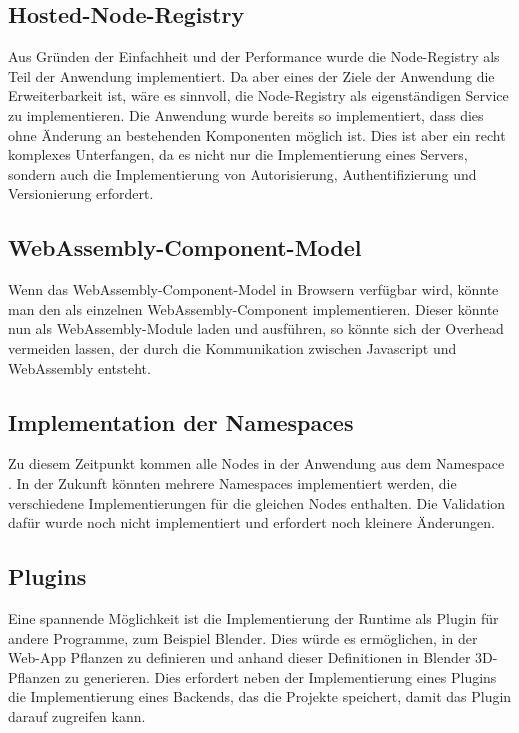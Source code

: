 \documentclass[ngerman]{article}
\begin{document}
\subsection*{Hosted-Node-Registry}
Aus Gründen der Einfachheit und der Performance wurde die Node-Registry als Teil der Anwendung implementiert. Da aber eines der Ziele der Anwendung die Erweiterbarkeit ist, wäre es sinnvoll, die Node-Registry als eigenständigen Service zu implementieren. Die Anwendung wurde bereits so implementiert, dass dies ohne Änderung an bestehenden Komponenten möglich ist.
\br
Dies ist aber ein recht komplexes Unterfangen, da es nicht nur die Implementierung eines Servers, sondern auch die Implementierung von Autorisierung, Authentifizierung und Versionierung erfordert.

\subsection*{WebAssembly-Component-Model}
Wenn das WebAssembly-Component-Model in Browsern verfügbar wird, könnte man den  als einzelnen WebAssembly-Component implementieren. Dieser könnte nun  als WebAssembly-Module laden und ausführen, so könnte sich der Overhead vermeiden lassen, der durch die Kommunikation zwischen Javascript und WebAssembly entsteht.

\subsection*{Implementation der Namespaces}
Zu diesem Zeitpunkt kommen alle Nodes in der Anwendung aus dem Namespace . In der Zukunft könnten mehrere Namespaces implementiert werden, die verschiedene Implementierungen für die gleichen Nodes enthalten. Die Validation dafür wurde noch nicht implementiert und erfordert noch kleinere Änderungen.

\subsection*{Plugins}
Eine spannende Möglichkeit ist die Implementierung der Runtime als Plugin für andere Programme, zum Beispiel Blender. Dies würde es ermöglichen, in der Web-App Pflanzen zu definieren und anhand dieser Definitionen in Blender 3D-Pflanzen zu generieren. Dies erfordert neben der Implementierung eines Plugins die Implementierung eines Backends, das die Projekte speichert, damit das Plugin darauf zugreifen kann.
\end{document}
